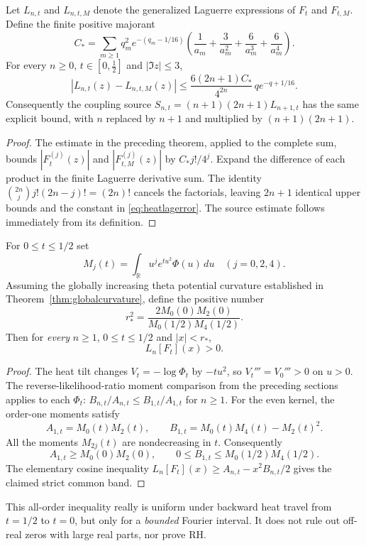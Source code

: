 \begin{corollary}
\label{cor:heatsources}
Let $L_{n,t}$ and $L_{n,t,M}$ denote
the generalized Laguerre expressions of
$F_t$ and $F_{t,M}$.
Define the finite positive majorant
\[
C_*=\sum_{m\ge1}q_m^2e^{-(q_m-1/16)}
\left(\frac1{a_m}+\frac3{a_m^2}
+\frac6{a_m^3}+\frac6{a_m^4}\right).
\]
For every $n\ge0$,
$t\in[0,\tfrac12]$ and $|\Im z|\le3$,
\begin{equation}
|L_{n,t}(z)-L_{n,t,M}(z)|
\le \frac{6(2n+1)C_*}{4^{2n}}\,
q e^{-q+1/16}.
\label{eq:heatlagerror}
\end{equation}
Consequently the coupling source
$S_{n,t}=(n+1)(2n+1)L_{n+1,t}$
has the same explicit bound,
with $n$ replaced by $n+1$ and
multiplied by $(n+1)(2n+1)$.
\end{corollary}
\begin{proof}
The estimate in the preceding theorem,
applied to the complete sum, bounds
$|F_t^{(j)}(z)|$ and
$|F_{t,M}^{(j)}(z)|$ by
$C_*j!/4^j$.
Expand the difference of each product
in the finite Laguerre derivative sum.
The identity
$\binom{2n}{j}j!(2n-j)!=(2n)!$
cancels the factorials, leaving
$2n+1$ identical upper bounds and
the constant in \eqref{eq:heatlagerror}.
The source estimate follows
immediately from its definition.
\end{proof}

\begin{proposition}
\label{prop:heatcommonband}
For $0\le t\le1/2$ set
\[
M_j(t)=\int_{\mathbb R}
u^j e^{tu^2}\Phi(u)\,du
\quad(j=0,2,4).
\]
Assuming the globally increasing theta potential
curvature established in
Theorem~\ref{thm:globalcurvature},
define the positive number
\[
r_*^2=
\frac{2M_0(0)M_2(0)}
{M_0(1/2)M_4(1/2)}.
\]
Then for \emph{every} $n\ge1$,
$0\le t\le1/2$ and $|x|<r_*$,
\[
L_n[F_t](x)>0.
\]
\end{proposition}
\begin{proof}
The heat tilt changes
$V_t=-\log\Phi_t$ by $-tu^2$,
so $V_t'''=V_0'''>0$ on $u>0$.
The reverse-likelihood-ratio
moment comparison from the preceding
sections applies to each $\Phi_t$:
$B_{n,t}/A_{n,t}\le B_{1,t}/A_{1,t}$
for $n\ge1$.
For the even kernel, the
order-one moments satisfy
\[
A_{1,t}=M_0(t)M_2(t),\qquad
B_{1,t}=M_0(t)M_4(t)-M_2(t)^2.
\]
All the moments $M_{2j}(t)$
are nondecreasing in $t$.
Consequently
\[
A_{1,t}\ge M_0(0)M_2(0),\qquad
0\le B_{1,t}\le M_0(1/2)M_4(1/2).
\]
The elementary cosine inequality
$L_n[F_t](x)\ge
A_{n,t}-x^2B_{n,t}/2$ gives
the claimed strict common band.
\end{proof}
This all-order inequality really is uniform
under backward heat travel from
$t=1/2$ to $t=0$, but only for
a \emph{bounded} Fourier interval.
It does not rule out off-real zeros
with large real parts, nor prove RH.

